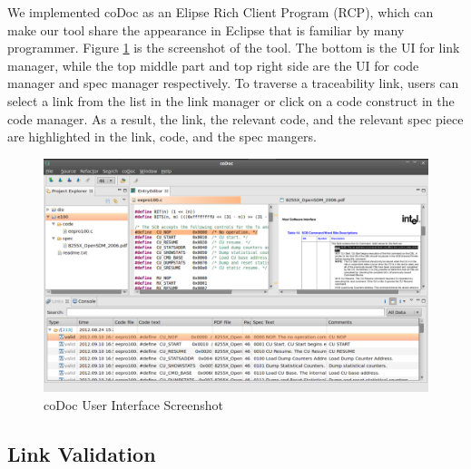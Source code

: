 We implemented coDoc as an Elipse Rich Client Program (RCP),
which can make our tool share the appearance in Eclipse that is familiar by many programmer.
Figure \ref{fig:platformview} is the screenshot of the tool.
The bottom is the UI for link manager, while the top middle part and top right side are the UI for code manager and spec manager respectively.
To traverse a traceability link, users can select a link from the list in the link manager or click on a code construct in the code manager. 
As a result, the link, the relevant code, and the relevant spec piece are highlighted in the link, code, and the spec mangers. 

\begin{figure}
\begin{center}
\includegraphics[width=\textwidth]{platformview}
\caption{coDoc User Interface Screenshot}
\label{fig:platformview}
\end{center}
\end{figure}


\subsection{Link Validation}


